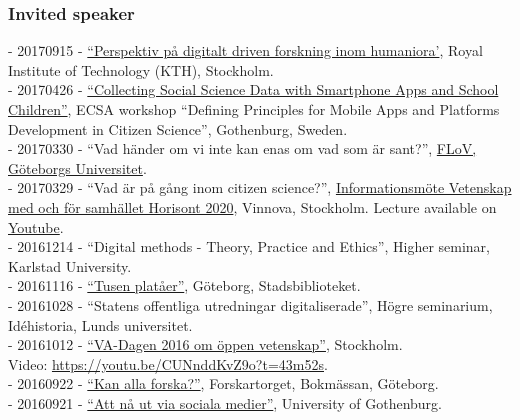 \documentclass[a4paper,11pt,oneside]{article}
\begin{document}
    \subsubsection{Invited speaker}
    - 20170915 - \href{http://patriksv.net/2017/08/program-and-inbjudna-deltagare-15-september-pa-kth/}{``Perspektiv på digitalt driven forskning inom humaniora'}, Royal Institute of Technology (KTH), Stockholm.\\
    - 20170426 - \href{https://ecsa.citizen-science.net/sites/default/files/draft_agenda_second_workshop_appsplatforms.pdf}{``Collecting Social Science Data with Smartphone Apps and School Children''}, ECSA workshop ``Defining Principles for Mobile Apps and Platforms Development in Citizen Science'', Gothenburg, Sweden. \\
    - 20170330 - ``Vad händer om vi inte kan enas om vad som är sant?'', \href{http://flov.gu.se/aktuellt/Nyheter/fulltext//oppet-hus-pa-flov-med-panelsamtal-om-alternativa-fakta-och-informationsbubblor.cid1428426}{FLoV, Göteborgs Universitet}.\\
    - 20170329 - ``Vad är på gång inom citizen science?'', \href{http://www.vinnova.se/sv/Aktuellt--publicerat/Kalendarium/2017/170329-Informationsmote-Vetenskap-med-och-for-samhallet/}{Informationsmöte Vetenskap med och för samhället Horisont 2020}, Vinnova, Stockholm. Lecture available on \href{https://youtu.be/HHW0j7Zo5E0}{Youtube}.\\
    - 20161214 - ``Digital methods - Theory, Practice and Ethics'', Higher seminar, Karlstad University.\\
    - 20161116 - \href{http://www.stadsbiblioteket.nu/tusen-plataer/}{``Tusen platåer''}, Göteborg, Stadsbiblioteket.\\
    - 20161028 - ``Statens offentliga utredningar digitaliserade'', Högre seminarium, Idéhistoria, Lunds universitet.\\
    - 20161012 - \href{https://v-a.se/events/va-dagen-2016/}{``VA-Dagen 2016 om öppen vetenskap''}, Stockholm. \\Video: \href{https://youtu.be/CUNnddKvZ9o?t=43m52s}{https://youtu.be/CUNnddKvZ9o?t=43m52s}.\\
    - 20160922 - \href{http://flov.gu.se/aktuellt/Nyheter/fulltext//sju-filosofer-forelaser-pa-bokmassan-.cid1403852}{``Kan alla forska?''}, Forskartorget, Bokmässan, Göteborg. \\
    - 20160921 - \href{http://kompetensutveckling.adm.gu.se/seminar/detail/2260}{``Att nå ut via sociala medier''}, University of Gothenburg. \\
\end{document}
